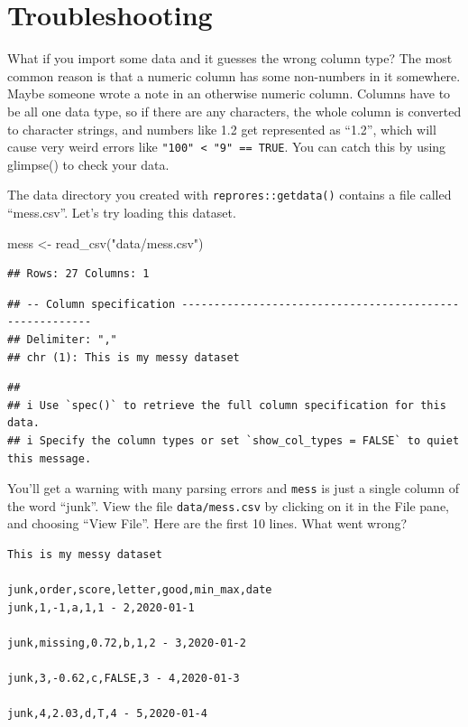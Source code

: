 \documentclass[
  oneside]{book}
\newenvironment{Shaded}{\begin{snugshade}}{\end{snugshade}}
\newcommand{\FunctionTok}[1]{\textcolor[rgb]{0.00,0.00,0.00}{#1}}
\newcommand{\NormalTok}[1]{#1}
\newcommand{\OtherTok}[1]{\textcolor[rgb]{0.56,0.35,0.01}{#1}}
\newcommand{\StringTok}[1]{\textcolor[rgb]{0.31,0.60,0.02}{#1}}
\begin{document}
\hypertarget{troubleshooting}{%
\section{Troubleshooting}\label{troubleshooting}}

What if you import some data and it guesses the wrong column type? The most common reason is that a numeric column has some non-numbers in it somewhere. Maybe someone wrote a note in an otherwise numeric column. Columns have to be all one data type, so if there are any characters, the whole column is converted to character strings, and numbers like {1.2} get represented as {``1.2''}, which will cause very weird errors like \texttt{"100"\ \textless{}\ "9"\ ==\ TRUE}. You can catch this by using {glimpse}{(}{)} to check your data.

The data directory you created with \texttt{reprores::getdata()} contains a file called ``mess.csv''. Let's try loading this dataset.

\begin{Shaded}
\begin{Highlighting}[]
\NormalTok{mess }\OtherTok{\textless{}{-}} \FunctionTok{read\_csv}\NormalTok{(}\StringTok{"data/mess.csv"}\NormalTok{)}
\end{Highlighting}
\end{Shaded}

\begin{verbatim}
## Rows: 27 Columns: 1
\end{verbatim}

\begin{verbatim}
## -- Column specification --------------------------------------------------------
## Delimiter: ","
## chr (1): This is my messy dataset
\end{verbatim}

\begin{verbatim}
## 
## i Use `spec()` to retrieve the full column specification for this data.
## i Specify the column types or set `show_col_types = FALSE` to quiet this message.
\end{verbatim}

You'll get a warning with many parsing errors and \texttt{mess} is just a single column of the word ``junk''. View the file \texttt{data/mess.csv} by clicking on it in the File pane, and choosing ``View File''. Here are the first 10 lines. What went wrong?

\begin{verbatim}
This is my messy dataset

junk,order,score,letter,good,min_max,date
junk,1,-1,a,1,1 - 2,2020-01-1

junk,missing,0.72,b,1,2 - 3,2020-01-2

junk,3,-0.62,c,FALSE,3 - 4,2020-01-3

junk,4,2.03,d,T,4 - 5,2020-01-4
\end{verbatim}
\end{document}
